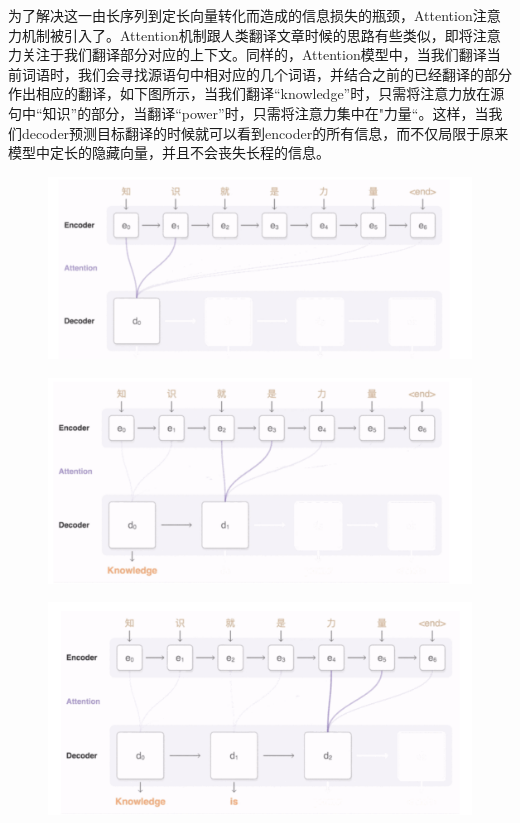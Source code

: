 \documentclass[12pt]{article}
\begin{document}
\begin{framed}
为了解决这一由长序列到定长向量转化而造成的信息损失的瓶颈，Attention注意力机制被引入了。Attention机制跟人类翻译文章时候的思路有些类似，即将注意力关注于我们翻译部分对应的上下文。同样的，Attention模型中，当我们翻译当前词语时，我们会寻找源语句中相对应的几个词语，并结合之前的已经翻译的部分作出相应的翻译，如下图所示，当我们翻译“knowledge”时，只需将注意力放在源句中“知识”的部分，当翻译“power”时，只需将注意力集中在"力量“。这样，当我们decoder预测目标翻译的时候就可以看到encoder的所有信息，而不仅局限于原来模型中定长的隐藏向量，并且不会丧失长程的信息。
\begin{figure}[H]
    \centering
    \includegraphics[width=.6\textwidth]{fig/Attention_Translate_Example_1.png}
\end{figure}
\begin{figure}[H]
    \centering
    \includegraphics[width=.6\textwidth]{fig/Attention_Translate_Example_2.png}
\end{figure}
\begin{figure}[H]
    \centering
    \includegraphics[width=.6\textwidth]{fig/Attention_Translate_Example_3.png}
\end{figure}


\end{framed}
\end{document}
